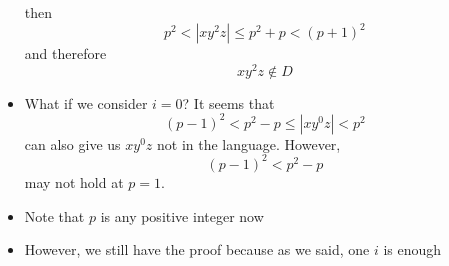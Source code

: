 \begin{frame}[allowframebreaks]
\begin{itemize}
then 
\begin{equation*}
p^2 < |xy^2z| \leq p^2 +p < (p+1)^2
\end{equation*}
and therefore
\begin{equation*}
  xy^2 z \notin D
\end{equation*}
\item What if we consider $i=0$? It seems that
  \begin{equation*}
(p-1)^2 < p^2 -p \leq |xy^0z| < p^2 
\end{equation*}
can also give us $xy^0z$ not in the language. However,
\begin{equation*}
  (p-1)^2 < p^2 -p
\end{equation*}
may not hold at $p = 1$. 
\item Note that $p$ is any positive integer now
\item However, we still have the proof because as we said,
  one $i$ is enough
\end{itemize}\end{frame}


